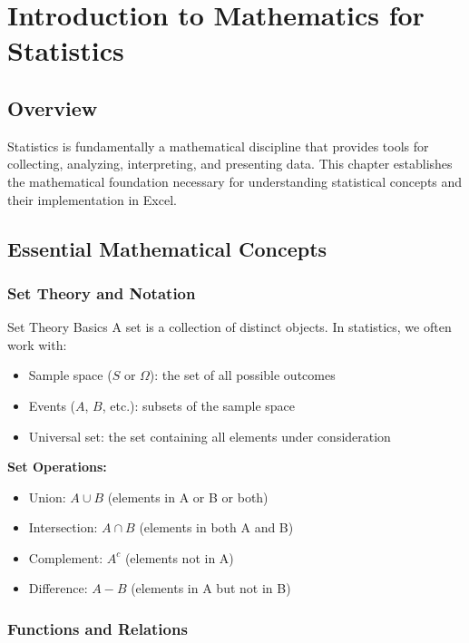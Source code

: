 \documentclass[12pt,a4paper]{book}
\begin{document}
\chapter{Introduction to Mathematics for Statistics}

\section{Overview}

Statistics is fundamentally a mathematical discipline that provides tools for collecting, analyzing, interpreting, and presenting data. This chapter establishes the mathematical foundation necessary for understanding statistical concepts and their implementation in Excel.

\section{Essential Mathematical Concepts}

\subsection{Set Theory and Notation}

\begin{definition}{Set Theory Basics}
A set is a collection of distinct objects. In statistics, we often work with:
\begin{itemize}
    \item Sample space ($S$ or $\Omega$): the set of all possible outcomes
    \item Events ($A$, $B$, etc.): subsets of the sample space
    \item Universal set: the set containing all elements under consideration
\end{itemize}
\end{definition}

\textbf{Set Operations:}
\begin{itemize}
    \item Union: $A \cup B$ (elements in A or B or both)
    \item Intersection: $A \cap B$ (elements in both A and B)
    \item Complement: $A^c$ (elements not in A)
    \item Difference: $A - B$ (elements in A but not in B)
\end{itemize}

\subsection{Functions and Relations}
\end{document}
